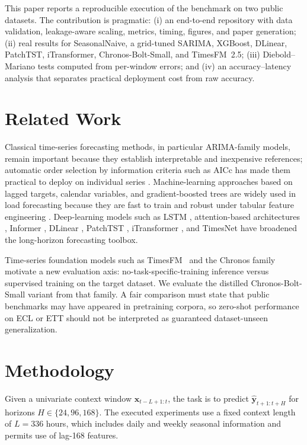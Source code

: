 \documentclass[conference]{IEEEtran}
\begin{document}
This paper reports a reproducible execution of the benchmark on two public datasets. The contribution is pragmatic: (i) an end-to-end repository with data validation, leakage-aware scaling, metrics, timing, figures, and paper generation; (ii) real results for SeasonalNaive, a grid-tuned SARIMA, XGBoost, DLinear, PatchTST, iTransformer, Chronos-Bolt-Small, and TimesFM~2.5; (iii) Diebold--Mariano tests computed from per-window errors; and (iv) an accuracy--latency analysis that separates practical deployment cost from raw accuracy.

\section{Related Work}
Classical time-series forecasting methods, in particular ARIMA-family models, remain important because they establish interpretable and inexpensive references; automatic order selection by information criteria such as AICc has made them practical to deploy on individual series \cite{hyndman2008automatic}. Machine-learning approaches based on lagged targets, calendar variables, and gradient-boosted trees are widely used in load forecasting because they are fast to train and robust under tabular feature engineering \cite{chen2016xgboost}. Deep-learning models such as LSTM \cite{hochreiter1997lstm}, attention-based architectures \cite{vaswani2017attention}, Informer \cite{zhou2021informer}, DLinear \cite{zeng2023dlinear}, PatchTST \cite{nie2023patchtst}, iTransformer \cite{liu2024itransformer}, and TimesNet \cite{wu2023timesnet} have broadened the long-horizon forecasting toolbox.

Time-series foundation models such as TimesFM~\cite{das2024timesfm} and the Chronos family~\cite{ansari2024chronos} motivate a new evaluation axis: no-task-specific-training inference versus supervised training on the target dataset. We evaluate the distilled Chronos-Bolt-Small variant from that family. A fair comparison must state that public benchmarks may have appeared in pretraining corpora, so zero-shot performance on ECL or ETT should not be interpreted as guaranteed dataset-unseen generalization.

\section{Methodology}
Given a univariate context window $\mathbf{x}_{t-L+1:t}$, the task is to predict $\hat{\mathbf{y}}_{t+1:t+H}$ for horizons $H \in \{24,96,168\}$. The executed experiments use a fixed context length of $L=336$ hours, which includes daily and weekly seasonal information and permits use of lag-168 features.
\end{document}
